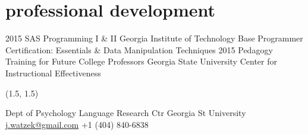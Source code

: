 \documentclass[]{friggeri-cv}
\begin{document}
\section{professional development}

\begin{entrylist}
  \entry
    {2015}
    {SAS Programming I \& II}
    {Georgia Institute of Technology}
    {Base Programmer Certification: Essentials \& Data Manipulation Techniques}
  \entry
    {2015}
    {Pedagogy Training for Future College Professors}
    {Georgia State University}
    {Center for Instructional Effectiveness}
\end{entrylist}


\renewenvironment{aside}{%
  \let\oldsection\section
  \renewcommand{\section}[1]{
    \par\vspace{\baselineskip}{\Large\headingfont\color{headercolor} ##1}
  }
  \begin{textblock}{3.6}(1.5, 1.5)
  \begin{flushright}
  \obeycr
}{%
  \restorecr
  \end{flushright}
  \end{textblock}
  \let\section\oldsection
}


\begin{aside}
  \section{{\normalfont julia}watzek}
    Dept of Psychology
    Language Research Ctr
    Georgia St University
    ~
    \href{mailto:j.watzek@gmail.com}{j.watzek@gmail.com}
    +1 (404) 840-6838
\end{aside}
\end{document}
